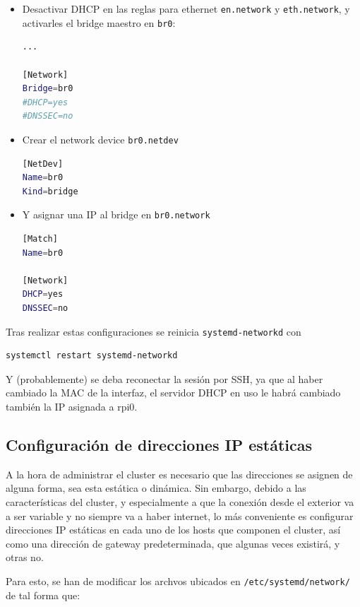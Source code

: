 \begin{itemize}
    \item Desactivar DHCP en las reglas para ethernet \texttt{en.network} y \texttt{eth.network}, y activarles el bridge maestro en \texttt{br0}:
\begin{lstlisting}[language=bash]
...

[Network]
Bridge=br0
#DHCP=yes
#DNSSEC=no
\end{lstlisting}
    \item Crear el network device \texttt{br0.netdev}
\begin{lstlisting}[language=bash]
[NetDev]
Name=br0
Kind=bridge
\end{lstlisting}
    \item Y asignar una IP al bridge en \texttt{br0.network}
\begin{lstlisting}[language=bash]
[Match]
Name=br0

[Network]
DHCP=yes
DNSSEC=no
\end{lstlisting}
\end{itemize}

Tras realizar estas configuraciones se reinicia \texttt{systemd-networkd} con
\begin{lstlisting}[language=bash]
systemctl restart systemd-networkd
\end{lstlisting}

Y (probablemente) se deba reconectar la sesión por SSH, ya que al haber cambiado la MAC de la interfaz, el servidor DHCP en uso le habrá cambiado también la IP asignada a rpi0.

\subsection{Configuración de direcciones IP estáticas}
\label{ssec:configuracion_ip_estaticas}
A la hora de administrar el cluster es necesario que las direcciones se asignen de alguna forma, sea esta estática o dinámica. Sin embargo, debido a las características del cluster, y especialmente a que la conexión desde el exterior va a ser variable y no siempre va a haber internet, lo más conveniente es configurar direcciones IP estáticas en cada uno de los hosts que componen el cluster, así como una dirección de gateway predeterminada, que algunas veces existirá, y otras no.

Para esto, se han de modificar los archvos ubicados en \texttt{/etc/systemd/network/} de tal forma que:

